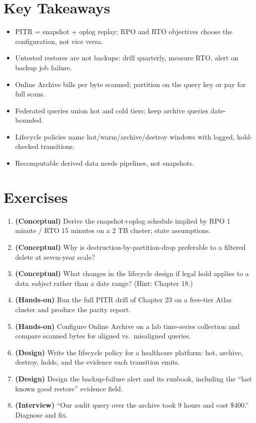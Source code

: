 \section*{Key Takeaways}
\begin{itemize}
    \item PITR = snapshot + oplog replay; RPO and RTO objectives choose the configuration, not vice versa.
    \item Untested restores are not backups: drill quarterly, measure RTO, alert on backup job failure.
    \item Online Archive bills per byte scanned; partition on the query key or pay for full scans.
    \item Federated queries union hot and cold tiers; keep archive queries date-bounded.
    \item Lifecycle policies name hot/warm/archive/destroy windows with logged, hold-checked transitions.
    \item Recomputable derived data needs pipelines, not snapshots.
\end{itemize}

\section{Exercises}
\begin{enumerate}
    \item \textbf{(Conceptual)} Derive the snapshot+oplog schedule implied by RPO 1 minute / RTO 15 minutes on a 2 TB cluster; state assumptions.
    \item \textbf{(Conceptual)} Why is destruction-by-partition-drop preferable to a filtered delete at seven-year scale?
    \item \textbf{(Conceptual)} What changes in the lifecycle design if legal hold applies to a data \emph{subject} rather than a date range? (Hint: Chapter 18.)
    \item \textbf{(Hands-on)} Run the full PITR drill of Chapter 23 on a free-tier Atlas cluster and produce the parity report.
    \item \textbf{(Hands-on)} Configure Online Archive on a lab time-series collection and compare scanned bytes for aligned vs.\ misaligned queries.
    \item \textbf{(Design)} Write the lifecycle policy for a healthcare platform: hot, archive, destroy, holds, and the evidence each transition emits.
    \item \textbf{(Design)} Design the backup-failure alert and its runbook, including the ``last known good restore'' evidence field.
    \item \textbf{(Interview)} ``Our audit query over the archive took 9 hours and cost \$400.'' Diagnose and fix.
\end{enumerate}

